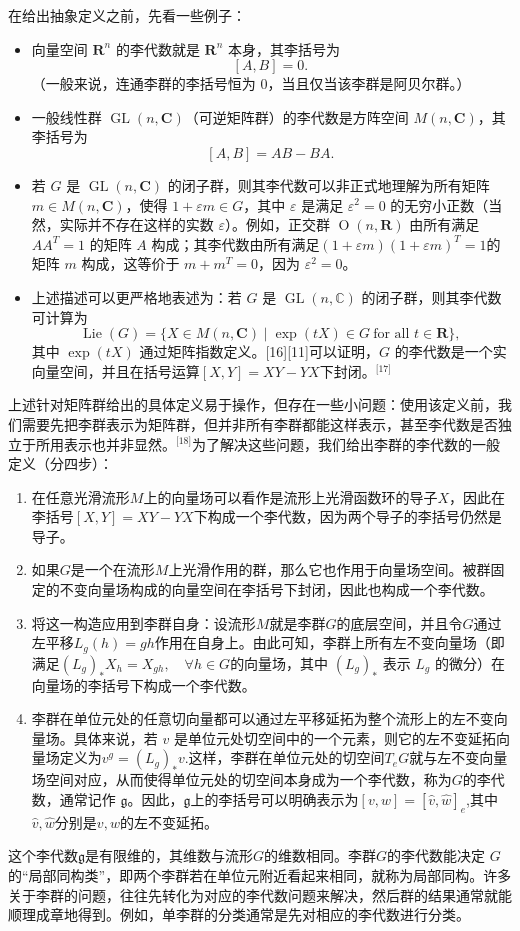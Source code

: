 在给出抽象定义之前，先看一些例子：
\begin{itemize}
\item 向量空间 $\mathbf{R}^n$ 的李代数就是 $\mathbf{R}^n$ 本身，其李括号为
  $$
  [A, B] = 0.~
  $$
  （一般来说，连通李群的李括号恒为 0，当且仅当该李群是阿贝尔群。）
\item 一般线性群 $\operatorname{GL}(n,\mathbf{C})$（可逆矩阵群）的李代数是方阵空间 $M(n,\mathbf{C})$，其李括号为
  $$
  [A, B] = AB - BA.~
  $$
\item 若 $G$ 是 $\operatorname{GL}(n,\mathbf{C})$ 的闭子群，则其李代数可以非正式地理解为所有矩阵 $m \in M(n,\mathbf{C})$，使得 $1 + \varepsilon m \in G$，其中 $\varepsilon$ 是满足 $\varepsilon^2 = 0$ 的无穷小正数（当然，实际并不存在这样的实数 $\varepsilon$）。例如，正交群 $\operatorname{O}(n,\mathbf{R})$ 由所有满足 $AA^{T} = 1$ 的矩阵 $A$ 构成；其李代数由所有满足$(1 + \varepsilon m)(1 + \varepsilon m)^{T} = 1$的矩阵 $m$ 构成，这等价于 $m + m^{T} = 0$，因为 $\varepsilon^{2} = 0$。
\item 上述描述可以更严格地表述为：若 $G$ 是 $\operatorname{GL}(n,\mathbb{C})$ 的闭子群，则其李代数可计算为
$$
\operatorname{Lie}(G) = \{ X \in M(n,\mathbf{C}) \mid \exp(tX) \in G \ \text{for all } t \in \mathbf{R} \},~
$$
其中 $\exp(tX)$ 通过矩阵指数定义。[16][11]可以证明，$G$ 的李代数是一个实向量空间，并且在括号运算$[X, Y] = XY - YX$下封闭。\(^\text{[17]}\)
\end{itemize}
上述针对矩阵群给出的具体定义易于操作，但存在一些小问题：使用该定义前，我们需要先把李群表示为矩阵群，但并非所有李群都能这样表示，甚至李代数是否独立于所用表示也并非显然。\(^\text{[18]}\)为了解决这些问题，我们给出李群的李代数的一般定义（分四步）：
\begin{enumerate}
\item 在任意光滑流形$M$上的向量场可以看作是流形上光滑函数环的导子$X$，因此在李括号$[X, Y] = XY - YX$下构成一个李代数，因为两个导子的李括号仍然是导子。
\item 如果$G$是一个在流形$M$上光滑作用的群，那么它也作用于向量场空间。被群固定的不变向量场构成的向量空间在李括号下封闭，因此也构成一个李代数。
\item 将这一构造应用到李群自身：设流形$M$就是李群$G$的底层空间，并且令$G$通过左平移$L_{g}(h) = gh$作用在自身上。由此可知，李群上所有左不变向量场（即满足$(L_{g})_{*}X_{h} = X_{gh}, \quad \forall h \in G$的向量场，其中 $(L_{g})_{*}$ 表示 $L_{g}$ 的微分）在向量场的李括号下构成一个李代数。
\item 李群在单位元处的任意切向量都可以通过左平移延拓为整个流形上的左不变向量场。具体来说，若 $v$ 是单位元处切空间中的一个元素，则它的左不变延拓向量场定义为$v^{g} = (L_{g})_{*}v$.这样，李群在单位元处的切空间$T_{e}G$就与左不变向量场空间对应，从而使得单位元处的切空间本身成为一个李代数，称为$G$的李代数，通常记作 $\mathfrak{g}$。因此，$\mathfrak{g}$上的李括号可以明确表示为$[v, w] = [\hat{v}, \hat{w}]_{e}$,其中$\hat{v}, \hat{w}$分别是$v, w$的左不变延拓。
\end{enumerate}
这个李代数$\mathfrak{g}$是有限维的，其维数与流形$G$的维数相同。李群$G$的李代数能决定 $G$的“局部同构类”，即两个李群若在单位元附近看起来相同，就称为局部同构。许多关于李群的问题，往往先转化为对应的李代数问题来解决，然后群的结果通常就能顺理成章地得到。例如，单李群的分类通常是先对相应的李代数进行分类。

